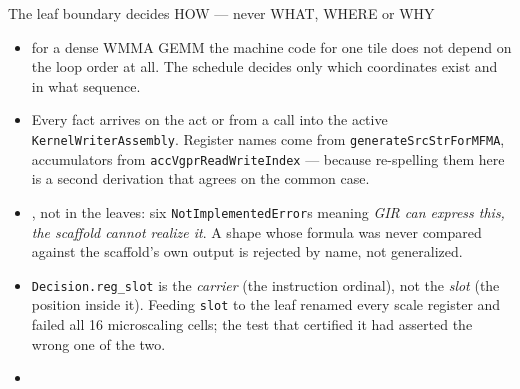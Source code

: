\begin{frame}{The leaf boundary decides HOW --- never WHAT, WHERE or WHY}
\centering
{}

\vspace{4pt}
\scriptsize
\begin{itemize}\itemsep2pt
  \item {} for a dense WMMA GEMM the machine code for one tile does
        not depend on the loop order at all. The schedule decides only which coordinates exist and
        in what sequence.
  \item {} Every fact arrives on the act or from a call into the active
        \texttt{KernelWriterAssembly}. Register names come from
        \texttt{generateSrcStrForMFMA}, accumulators from \texttt{accVgprReadWriteIndex} --- because
        re-spelling them here is a second derivation that agrees on the common case.
  \item {}, not in the leaves: six
        \texttt{NotImplementedError}s meaning \emph{GIR can express this, the scaffold cannot
        realize it}. A shape whose formula was never compared against the scaffold's own output is
        rejected by name, not generalized.
  \item {} \texttt{Decision.reg\_slot} is the
        \emph{carrier} (the instruction ordinal), not the \emph{slot} (the position inside it).
        Feeding \texttt{slot} to the leaf renamed every scale register and failed all 16
        microscaling cells; the test that certified it had asserted the wrong one of the two.
  \item {}
\end{itemize}
\end{frame}
